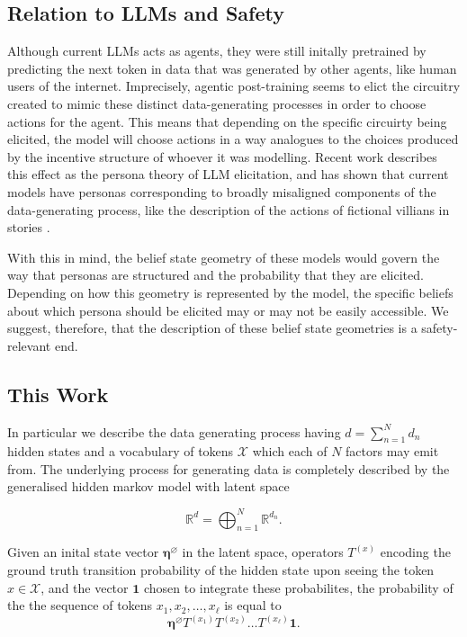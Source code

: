 \documentclass[11pt,a4paper]{article}
\begin{document}
\subsection*{Relation to LLMs and Safety}

Although current LLMs acts as agents, they were still initally pretrained by predicting the next token in data that was generated by other agents, like human users of the internet. Imprecisely, agentic post-training seems to elict the circuitry created to mimic these distinct data-generating processes in order to choose actions for the agent. This means that depending on the specific circuirty being elicited, the model will choose actions in a way analogues to the choices produced by the incentive structure of whoever it was modelling. Recent work describes this effect as the persona theory of LLM elicitation, and has shown that current models have personas corresponding to broadly misaligned components of the data-generating process, like the description of the actions of fictional villians in stories \cite{betley2025emergentmisalignment}.

\vspace{5mm}

With this in mind, the belief state geometry of these models would govern the way that personas are structured and the probability that they are elicited. Depending on how this geometry is represented by the model, the specific beliefs about which persona should be elicited may or may not be easily accessible. We suggest, therefore, that the description of these belief state geometries is a safety-relevant end.
\subsection*{This Work}


\vspace{5mm}
In particular we describe the data generating process having $d=\sum_{n=1}^Nd_n$ hidden states and a vocabulary of tokens $\mathcal{X}$ which each of $N$ factors may emit from. The underlying process for generating data is completely described by the generalised hidden markov model with latent space

$$\mathbb{R}^d=\bigoplus_{n=1}^N\mathbb{R}^{d_n}.$$

Given an inital state vector $\mathbf {\eta}^{\varnothing}$ in the latent space, operators $T^{(x)}$ encoding the ground truth transition probability of the hidden state upon seeing the token $x\in\mathcal X$, and the vector $\mathbf{1}$ chosen to integrate these probabilites, the probability of the the sequence of tokens $x_1,x_2,\dots,x_\ell$ is equal to
$$\mathbf {\eta}^{\varnothing}T^{(x_1)}T^{(x_2)}\dots T^{(x_\ell)}\mathbf{1}.$$
\end{document}
